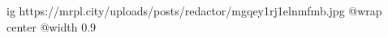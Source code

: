  
 
 
 
 

\ifcmt
  ig https://mrpl.city/uploads/posts/redactor/mgqey1rj1elnmfmb.jpg
  @wrap center
  @width 0.9
\fi
